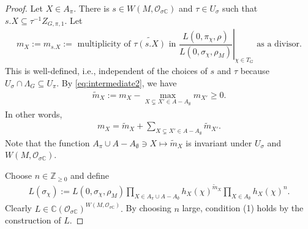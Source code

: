 \documentclass[10pt]{amsart}
\theoremstyle{definition}
\numberwithin{equation}{section}
\numberwithin{equation}{subsection}
\newcommand{\ZZ}{\mathbb{Z}}
\newcommand{\CC}{\mathbb{C}}
\begin{document}
\begin{proof}
    
    Let $X\in A_\pi.$ There is $s\in W(M,\mathcal{O}_{\sigma\CC})$ and $\tau\in U_\sigma$ such that $s.X\subseteq \tau^{-1} Z_{G,\pi,1}.$ Let 
    \begin{align*}
        m_X:=m_{s.X}:=\text{ multiplicity of $\widetilde{\tau(s.X)}$ in $\left.\dfrac{L(0,\pi_{\chi},\rho)}{L(0,\sigma_{\chi},\rho_M)}\right|_{\chi\in T_{G}}$ as a divisor}.
    \end{align*}
    This is well-defined, i.e., independent of the choices of $s$ and $\tau$ because $U_\sigma\cap \Lambda_G \subseteq U_\pi$. By \eqref{eq:intermediate2}, we have
    \begin{align*}
        \widetilde{m}_X:=m_X-\max_{X\subsetneq X'\in A-A_\emptyset} m_{X'}\ge 0.
    \end{align*}
    In other words,
    \begin{align}\label{eq:sumequal}
        m_X=\widetilde{m}_X+\sum_{X\subsetneq X'\in A-A_\emptyset} \widetilde{m}_{X'}.
    \end{align}
    Note that the function $A_\pi \cup A-A_\emptyset\ni X\mapsto \widetilde{m}_X$ is invariant under $U_\sigma$ and $W(M,\mathcal{O}_{\sigma\CC}).$ 
    
    Choose $n\in \ZZ_{\ge 0}$ and define
    \begin{align*}
        L(\sigma_\chi) := L(0,\sigma_\chi,\rho_M) \prod_{X\in A_\pi \cup A-A_\emptyset} h_X(\chi)^{\widetilde{m}_X} \prod_{X\in A_{\emptyset}} h_X(\chi)^{n}.
    \end{align*}
    Clearly $L\in \CC(\mathcal{O}_{\sigma\CC})^{W(M,\mathcal{O}_{\sigma\CC})}.$ By choosing $n$ large, condition (1) holds by the construction of $L.$ 


\end{proof}
\end{document}

